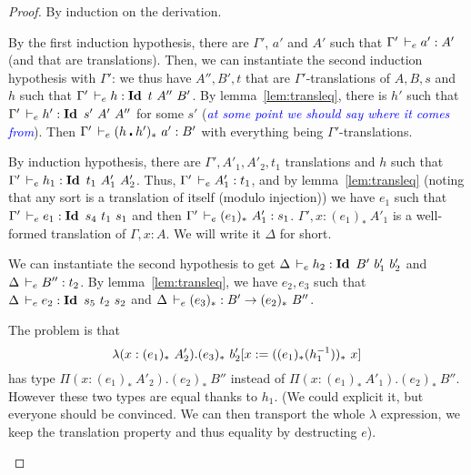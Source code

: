 \documentclass[a4paper,english]{lipics-utf8x}
\newcommand\meta[1]{\noindent\textcolor{blue}{\emph{#1}}}
\begin{document}
  \begin{proof}
    By induction on the derivation.

    \leavevmode
    \begin{caselist}
      \nextcase
      \begin{mathc}
      \end{mathc}
      By the first induction hypothesis, there are $\Gamma'$, $a'$ and $A'$
      such that $\Gamma' \,\vdash_e a' : A'$ (and that are translations).
      Then, we can instantiate the second induction hypothesis with $\Gamma'$:
      we thus have $A'',B',t$ that are $\Gamma'$-translations of $A,B,s$ and
      $h$ such that $\Gamma' \dere h : \Id t\ A''\ B'$.
      By lemma~\ref{lem:transleq}, there is $h'$ such that
      $\Gamma' \dere h' : \Id s'\ A'\ A''$ for some $s'$ (\meta{at some point
      we should say where it comes from}).
      Then $\Gamma' \,\vdash_e (h \centerdot h')_*\ a' : B'$ with everything being
      $\Gamma'$-translations.

      \nextcase
      \begin{mathc}
      \end{mathc}
      By induction hypothesis, there are $\Gamma',A'_1,A'_2,t_1$ translations
      and $h$ such that $\Gamma' \dere h_1 : \Id t_1\ A'_1\ A'_2$.
      Thus, $\Gamma' \,\vdash_e A'_1 : t_1$, and by lemma~\ref{lem:transleq}
      (noting that any sort is a translation of itself (modulo injection))
      we have $e_1$ such that $\Gamma' \dere e_1 : \Id s_4\ t_1\ s_1$ and
      then $\Gamma' \dere (e_1)_*\ A'_1 : s_1$.
      $\Gamma', x : (e_1)_*\ A'_1$ is a well-formed translation of
      $\Gamma, x:A$. We will write it $\Delta$ for short.

      We can instantiate the second hypothesis to get
      $\Delta \,\vdash_e h_2 : \operatorname{\mathbf{Id}~} B'\ b'_1\ b'_2$ and $\Delta \,\vdash_e B'' : t_2$.
      By lemma~\ref{lem:transleq}, we have $e_2,e_3$ such that
      $\Delta \dere e_2 : \Id s_5\ t_2\ s_2$ and
      $\Delta \,\vdash_e (e_3)_* : B' \to (e_2)_*\ B''$.

      The problem is that
      \[
        \lambda (x : (e_1)_*\ A'_2). (e_3)_*\ b'_2[x := ((e_1)_* (h_1^{-1}))_*\ x]
      \]
      has type
      $\Pi (x : (e_1)_*\ A'_2). (e_2)_*\ B''$ instead of
      $\Pi (x : (e_1)_*\ A'_1). (e_2)_*\ B''$.
      However these two types are equal thanks to $h_1$.
      (We could explicit it, but everyone should be convinced. We can then
      transport the whole $\lambda$ expression, we keep the translation
      property and thus equality by destructing $e$).


\end{caselist}
\end{proof}
\end{document}
